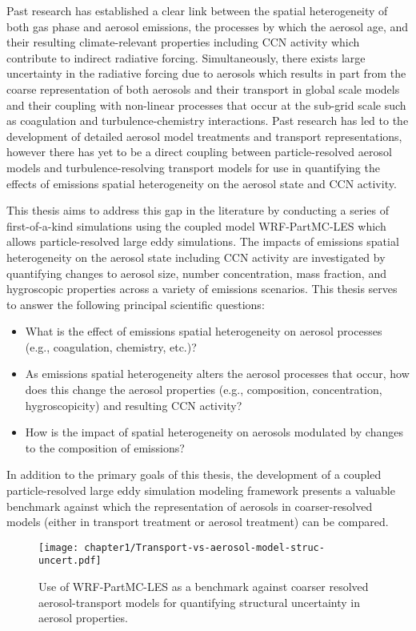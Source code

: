 Past research has established a clear link between the spatial heterogeneity of both gas phase and aerosol emissions, the processes by which the aerosol age, and their resulting climate-relevant properties including CCN activity which contribute to indirect radiative forcing. Simultaneously, there exists large uncertainty in the radiative forcing due to aerosols which results in part from the coarse representation of both aerosols and their transport in global scale models and their coupling with non-linear processes that occur at the sub-grid scale such as coagulation and turbulence-chemistry interactions. Past research has led to the development of detailed aerosol model treatments and transport representations, however there has yet to be a direct coupling between particle-resolved aerosol models and turbulence-resolving transport models for use in quantifying the effects of emissions spatial heterogeneity on the aerosol state and CCN activity. 

This thesis aims to address this gap in the literature by conducting a series of first-of-a-kind simulations using the coupled model WRF-PartMC-LES which allows particle-resolved large eddy simulations. The impacts of emissions spatial heterogeneity on the aerosol state including CCN activity are investigated by quantifying changes to aerosol size, number concentration, mass fraction, and hygroscopic properties across a variety of emissions scenarios. This thesis serves to answer the following principal scientific questions:
\begin{itemize}
\item What is the effect of emissions spatial heterogeneity on aerosol processes (e.g., coagulation, chemistry, etc.)?
\item As emissions spatial heterogeneity alters the aerosol processes that occur, how does this change the aerosol properties (e.g., composition, concentration, hygroscopicity) and resulting CCN activity? 
\item How is the impact of spatial heterogeneity on aerosols modulated by changes to the composition of emissions?
\end{itemize}

In addition to the primary goals of this thesis, the development of a coupled particle-resolved large eddy simulation modeling framework presents a valuable benchmark against which the representation of aerosols in coarser-resolved models (either in transport treatment or aerosol treatment) can be compared.

\begin{figure}[!t]
	\centering
	\texttt{[image: chapter1/Transport-vs-aerosol-model-struc-uncert.pdf]}
	\caption{Use of WRF-PartMC-LES as a benchmark against coarser resolved aerosol-transport models for quantifying structural uncertainty in aerosol properties.}
	\label{fig:transport-vs-aerosol-model}
\end{figure} 

